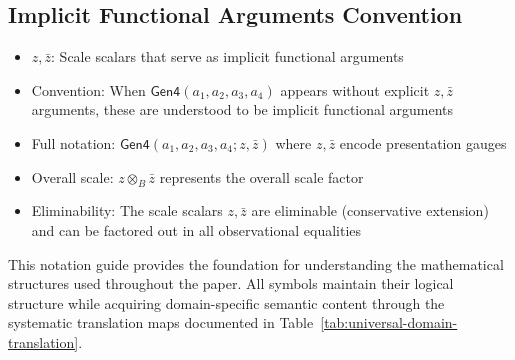 \subsection{Implicit Functional Arguments Convention}
\begin{itemize}
\item $z, \bar{z}$: Scale scalars that serve as implicit functional arguments
\item Convention: When $\mathsf{Gen4}(a_1, a_2, a_3, a_4)$ appears without explicit $z, \bar{z}$ arguments, these are understood to be implicit functional arguments
\item Full notation: $\mathsf{Gen4}(a_1, a_2, a_3, a_4; z, \bar{z})$ where $z, \bar{z}$ encode presentation gauges
\item Overall scale: $z \otimes_B \bar{z}$ represents the overall scale factor
\item Eliminability: The scale scalars $z, \bar{z}$ are eliminable (conservative extension) and can be factored out in all observational equalities
\end{itemize}

This notation guide provides the foundation for understanding the mathematical structures used throughout the paper. All symbols maintain their logical structure while acquiring domain-specific semantic content through the systematic translation maps documented in Table~\ref{tab:universal-domain-translation}.
